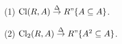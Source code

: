 (1) $\text{Cl}(R, A) \overset{\Delta}{\rightarrow} R"\{A \subseteq A\}$.

(2) $\text{Cl}_2(R, A) \overset{\Delta}{\rightarrow} R"\{A^2 \subseteq A\}$.
